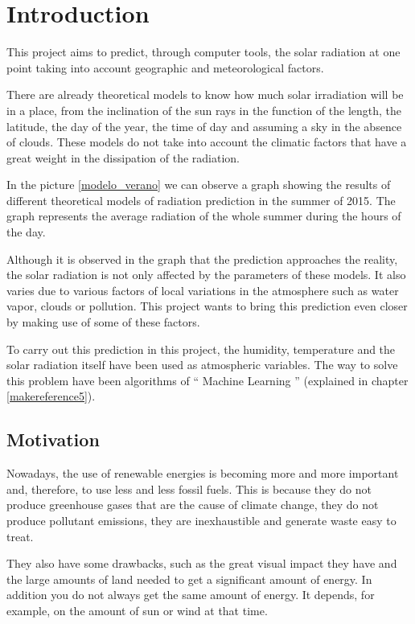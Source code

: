 \cleardoublepage

\chapter{Introduction}
\label{makereference2}

This project aims to predict, through computer tools, the solar radiation at one point taking into account geographic and meteorological factors.

There are already theoretical models to know how much solar irradiation will be in a place, from the inclination of the sun rays in the function of the length, the latitude, the day of the year, the time of day and assuming a sky in the absence of clouds. These models do not take into account the climatic factors that have a great weight in the dissipation of the radiation.

In the picture \ref{modelo_verano} we can observe a graph showing the results of different theoretical models of radiation prediction in the summer of 2015. The graph represents the average radiation of the whole summer during the hours of the day.

Although it is observed in the graph that the prediction approaches the reality, the solar radiation is not only affected by the parameters of these models. It also varies due to various factors of local variations in the atmosphere such as water vapor, clouds or pollution. This project wants to bring this prediction even closer by making use of some of these factors.

To carry out this prediction in this project, the humidity, temperature and the solar radiation itself have been used as atmospheric variables. The way to solve this problem have been algorithms of `` Machine Learning '' (explained in chapter \ref{makereference5}).

\section{Motivation}
\label{makereference2.1}

Nowadays, the use of renewable energies is becoming more and more important and, therefore, to use less and less fossil fuels. This is because they do not produce greenhouse gases that are the cause of climate change, they do not produce pollutant emissions, they are inexhaustible and generate waste easy to treat.

They also have some drawbacks, such as the great visual impact they have and the large amounts of land needed to get a significant amount of energy. In addition you do not always get the same amount of energy. It depends, for example, on the amount of sun or wind at that time.

